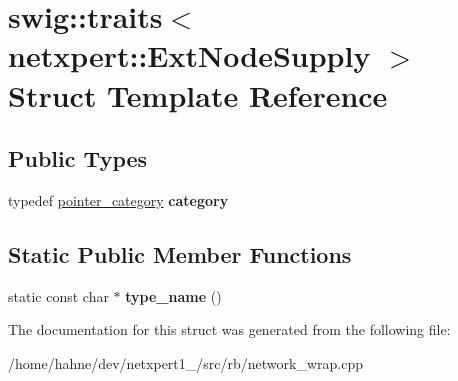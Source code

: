 \hypertarget{structswig_1_1traits_3_01netxpert_1_1ExtNodeSupply_01_4}{}\section{swig\+:\+:traits$<$ netxpert\+:\+:Ext\+Node\+Supply $>$ Struct Template Reference}
\label{structswig_1_1traits_3_01netxpert_1_1ExtNodeSupply_01_4}
\subsection*{Public Types}
\begin{DoxyCompactItemize}
\item 
typedef \hyperlink{structswig_1_1pointer__category}{pointer\+\_\+category} {\bfseries category}\hypertarget{structswig_1_1traits_3_01netxpert_1_1ExtNodeSupply_01_4_aa728e1043c3916cf722a9ee69ed94fbd}{}\label{structswig_1_1traits_3_01netxpert_1_1ExtNodeSupply_01_4_aa728e1043c3916cf722a9ee69ed94fbd}

\end{DoxyCompactItemize}
\subsection*{Static Public Member Functions}
\begin{DoxyCompactItemize}
\item 
static const char $\ast$ {\bfseries type\+\_\+name} ()\hypertarget{structswig_1_1traits_3_01netxpert_1_1ExtNodeSupply_01_4_ad1c59b1df3d9ae12ef6b25029a263832}{}\label{structswig_1_1traits_3_01netxpert_1_1ExtNodeSupply_01_4_ad1c59b1df3d9ae12ef6b25029a263832}

\end{DoxyCompactItemize}


The documentation for this struct was generated from the following file\+:\begin{DoxyCompactItemize}
\item 
/home/hahne/dev/netxpert1\+\_/src/rb/network\+\_\+wrap.\+cpp\end{DoxyCompactItemize}
